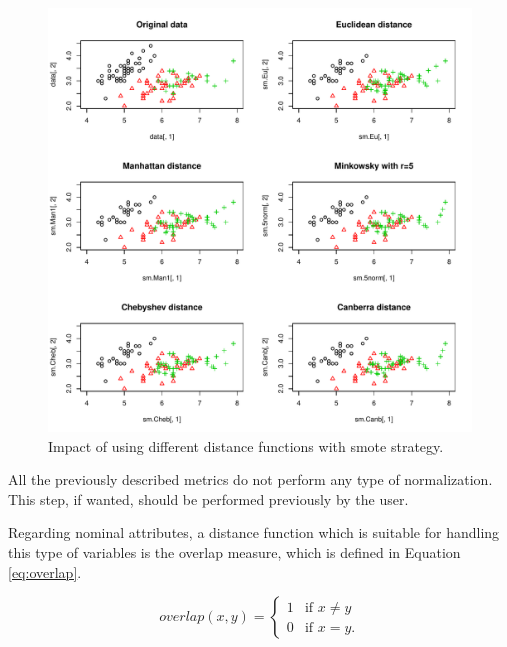 \documentclass[10pt,a4paper]{article}\usepackage[]{graphicx}\usepackage[]{color}
\makeatletter
\def\maxwidth{ %
  \ifdim\Gin@nat@width>\linewidth
    \linewidth
  \else
    \Gin@nat@width
  \fi
}
\newenvironment{knitrout}{}{} %
\makeatother
\begin{document}
\begin{knitrout}\footnotesize
{}\color{fgcolor}\begin{figure}

{\centering \includegraphics[width=\maxwidth]{figures/UBL-dist_num-1} 

}

\caption[Impact of using different distance functions with smote strategy]{Impact of using different distance functions with smote strategy.}\label{fig:dist_num}
\end{figure}


\end{knitrout}

All the previously described metrics do not perform any type of normalization. This step, if wanted, should be performed previously by the user.


Regarding nominal attributes, a distance function which is suitable for handling this type of variables is the overlap measure, which is defined in Equation \ref{eq:overlap}.


\begin{equation}\label{eq:overlap}
overlap(x,y) = \begin{cases} 1 &\mbox{if } x \neq y \\
0 & \mbox{if } x = y. \end{cases} 
\end{equation}
\end{document}
